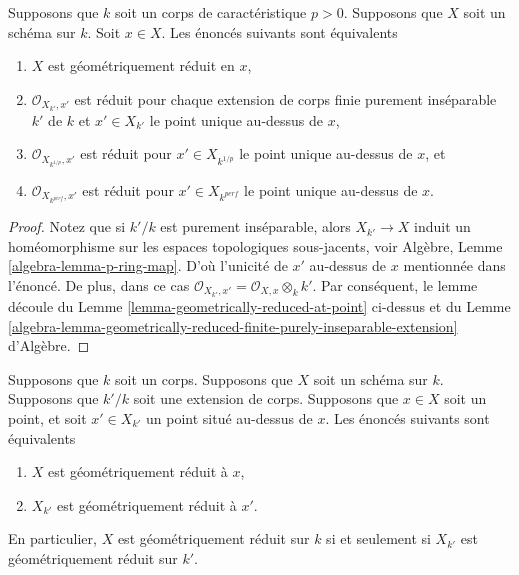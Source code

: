 \begin{lemma}
\label{lemma-check-only-finite-inseparable-extensions}
Supposons que $k$ soit un corps de caractéristique $p > 0$. Supposons que $X$
soit un schéma sur $k$. Soit $x \in X$. Les énoncés suivants sont équivalents
\begin{enumerate}
\item $X$ est géométriquement réduit en $x$, \item
$\mathcal{O}_{X_{k'}, x'}$ est réduit pour chaque
extension de corps finie purement inséparable $k'$ de
$k$ et $x' \in X_{k'}$ le point unique au-dessus de $x$,
\item $\mathcal{O}_{X_{k^{1/p}}, x'}$ est réduit pour
$x' \in X_{k^{1/p}}$ le point unique au-dessus de $x$,
et \item $\mathcal{O}_{X_{k^{perf}}, x'}$ est réduit pour
$x' \in X_{k^{perf}}$ le point unique au-dessus de $x$.
\end{enumerate}
\end{lemma}

\begin{proof}
Notez que si $k'/k$ est purement inséparable, alors $X_{k'}
\to X$ induit un homéomorphisme sur les espaces
topologiques sous-jacents, voir Algèbre, Lemme
\ref{algebra-lemma-p-ring-map}. D'où l'unicité de $x'$
au-dessus de $x$ mentionnée dans l'énoncé. De plus, dans ce cas
$\mathcal{O}_{X_{k'}, x'} = \mathcal{O}_{X, x} \otimes_k k'$.
Par conséquent, le lemme découle du Lemme
\ref{lemma-geometrically-reduced-at-point} ci-dessus et du Lemme
\ref{algebra-lemma-geometrically-reduced-finite-purely-inseparable-extension} d'Algèbre.
\end{proof}

\begin{lemma}
\label{lemma-geometrically-reduced-upstairs}
Supposons que $k$ soit un corps. Supposons que $X$
soit un schéma sur $k$. Supposons que $k'/k$ soit
une extension de corps. Supposons que $x \in X$ soit
un point, et soit $x' \in X_{k'}$ un point situé
au-dessus de $x$. Les énoncés suivants sont équivalents
\begin{enumerate}
\item $X$ est géométriquement réduit à $x$,
\item $X_{k'}$ est géométriquement réduit à $x'$.
\end{enumerate}
En particulier, $X$ est géométriquement réduit sur $k$ si et
seulement si $X_{k'}$ est géométriquement réduit sur $k'$.
\end{lemma}

